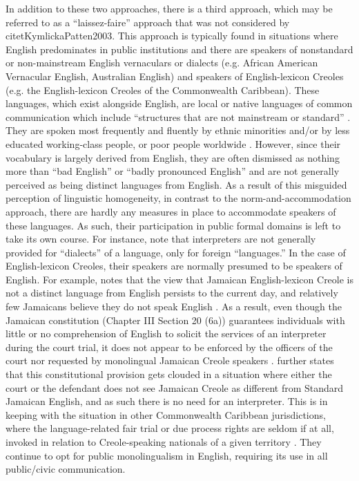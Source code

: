 \documentclass[output=paper,colorlinks,citecolor=brown]{langscibook}
\begin{document}
In addition to these two approaches, there is a third approach, which may be referred to as a “laissez-faire” approach that was not considered by citet{KymlickaPatten2003}. This approach is typically found in situations where English predominates in public institutions and there are speakers of nonstandard or non-mainstream English vernaculars or dialects (e.g. African American Vernacular English, Australian English) and speakers of English-lexicon Creoles (e.g. the English-lexicon Creoles of the Commonwealth Caribbean). These languages, which exist alongside English, are local or native languages of common communication which include “structures that are not mainstream or standard” \citep[16]{WolframSchilling2015}. They are spoken most frequently and fluently by ethnic minorities and/or by less educated working-class people, or poor people worldwide \citep{RickfordKing2016}. However, since their vocabulary is largely derived from English, they are often dismissed as nothing more than “bad English” or “badly pronounced English” and are not generally perceived as being distinct languages from English. As a result of this misguided perception of linguistic homogeneity, in contrast to the norm-and-accommodation approach, there are hardly any measures in place to accommodate speakers of these languages. As such, their participation in public formal domains is left to take its own course. For instance, \citet[951]{RickfordKing2016} note that interpreters are not generally provided for “dialects” of a language, only for foreign “languages.” In the case of English-lexicon Creoles, their speakers are normally presumed to be speakers of English. For example, \citet{BrownBlake2008} notes that the view that Jamaican English-lexicon Creole is not a distinct language from English persists to the current day, and relatively few Jamaicans believe they do not speak English \citep{Brown-BlakeChambers2007}. As a result, even though the Jamaican constitution (Chapter III Section 20 (6a)) guarantees individuals with little or no comprehension of English to solicit the services of an interpreter during the court trial, it does not appear to be enforced by the officers of the court nor requested by monolingual Jamaican Creole speakers \citep{Forrester2014}. \citet[228]{Forrester2014} further states that this constitutional provision gets clouded in a situation where either the court or the defendant does not see Jamaican Creole as different from Standard Jamaican English, and as such there is no need for an interpreter. This is in keeping with the situation in other Commonwealth Caribbean jurisdictions, where the language-related fair trial or due process rights are seldom if at all, invoked in relation to Creole-speaking nationals of a given territory \citep[4]{Brown-Blake_Devonish2012}. They continue to opt for public monolingualism in English, requiring its use in all public/civic communication. 
\end{document}
